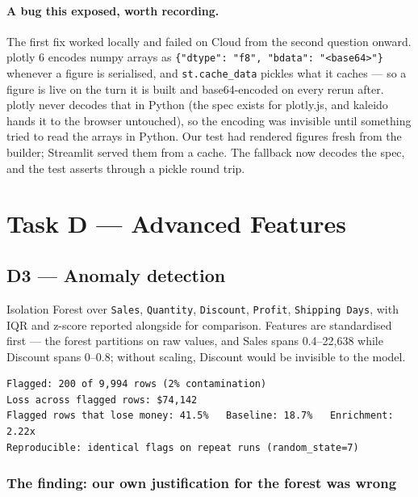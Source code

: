 \documentclass[11pt,a4paper]{article}
\begin{document}
\paragraph{A bug this exposed, worth recording.} The first fix worked locally and failed
on Cloud from the second question onward. plotly 6 encodes numpy arrays as
\texttt{\{"dtype": "f8", "bdata": "<base64>"\}} whenever a figure is serialised, and
\texttt{st.cache\_data} pickles what it caches --- so a figure is live on the turn it is
built and base64-encoded on every rerun after. plotly never decodes that in Python
(the spec exists for plotly.js, and kaleido hands it to the browser untouched), so the
encoding was invisible until something tried to read the arrays in Python. Our test had
rendered figures fresh from the builder; Streamlit served them from a cache. The
fallback now decodes the spec, and the test asserts through a pickle round trip.

\section{Task D --- Advanced Features}

\subsection{D3 --- Anomaly detection}
\label{sec:anomaly}

Isolation Forest over \texttt{Sales}, \texttt{Quantity}, \texttt{Discount},
\texttt{Profit}, \texttt{Shipping Days}, with IQR and z-score reported alongside for
comparison. Features are standardised first --- the forest partitions on raw values, and
Sales spans 0.4--22,638 while Discount spans 0--0.8; without scaling, Discount would be
invisible to the model.

\begin{lstlisting}
Flagged: 200 of 9,994 rows (2% contamination)
Loss across flagged rows: $74,142
Flagged rows that lose money: 41.5%   Baseline: 18.7%   Enrichment: 2.22x
Reproducible: identical flags on repeat runs (random_state=7)
\end{lstlisting}

\subsubsection*{The finding: our own justification for the forest was wrong}
\end{document}
